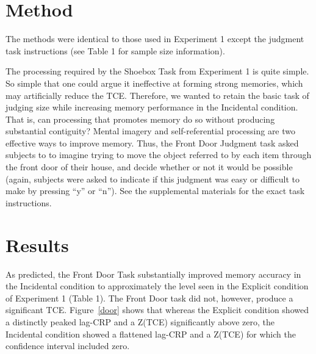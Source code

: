 \documentclass[jou,natbib]{apa6} %
\begin{document}
\section{Method}

The methods were identical to those used in Experiment 1 except the judgment task instructions (see Table 1 for sample size information).

The processing required by the Shoebox Task from Experiment 1 is quite simple. So simple that one could argue it ineffective at forming strong memories, which may artificially reduce the TCE. Therefore, we wanted to retain the basic task of judging size while increasing memory performance in the Incidental condition. That is, can processing that promotes memory do so without producing substantial contiguity? Mental imagery and self-referential processing are two effective ways to improve memory. Thus, the Front Door Judgment task asked subjects to to imagine trying to move the object referred to by each item through the front door of their house, and decide whether or not it would be possible (again, subjects were asked to indicate if this judgment was easy or difficult to make by pressing ``y'' or ``n'').
See the supplemental materials for the exact task instructions.

\section{Results}
As predicted, the Front Door Task substantially improved memory accuracy in the Incidental condition to approximately the level seen in the Explicit condition of Experiment 1 (Table 1). The Front Door task did not, however, produce a significant TCE. Figure~\ref{door} shows that whereas the Explicit condition showed a distinctly peaked lag-CRP and a Z(TCE) significantly above zero, the Incidental condition showed a flattened lag-CRP and a Z(TCE) for which the confidence interval included zero.

\begin{figure*}%
\caption{The temporal contiguity effect (TCE) with the Front Door size judgment task under explicit versus incidental encoding. \paneltext}
\label{door}
\end{figure*}
\end{document}
